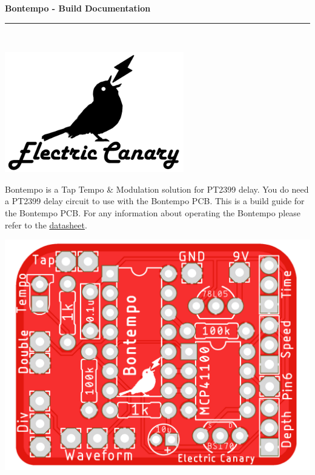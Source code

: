 \documentclass[a4paper, 10pt]{article}
\begin{document}
\thispagestyle{plain}
\begin{center}
\begin{Huge}
\vspace*{0.5cm}
\textbf{Bontempo - Build Documentation}
\rule {0.95\textwidth}{2pt}\\
\end{Huge}
\vspace{1cm}
\includegraphics[scale=1]{logocentre}\\
\end{center}
\vspace{1cm}
Bontempo is a Tap Tempo \& Modulation solution for PT2399 delay. You do need a PT2399 delay circuit to use with the Bontempo PCB. This is a build guide for the Bontempo PCB. For any information about operating the Bontempo please refer to the \href{https://electric-canary.com/assets/bontempo---datasheet.pdf}{\underline{datasheet}}. \\

\vfill
\begin{center}
\includegraphics[scale=0.3]{BontempoPCB}
\end{center}
\vfill
\newpage
\end{document}
